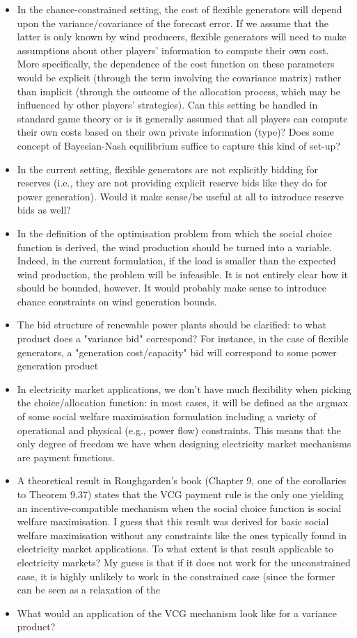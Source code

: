 \documentclass{article}
\begin{document}
\begin{itemize}
\item In the chance-constrained setting, the cost of flexible generators will depend upon the variance/covariance of the forecast error. If we assume that the latter is only known by wind producers, flexible generators will need to make assumptions about other players' information to compute their own cost. More specifically, the dependence of the cost function on these parameters would be explicit (through the term involving the covariance matrix) rather than implicit (through the outcome of the allocation process, which may be influenced by other players' strategies). Can this setting be handled in standard game theory or is it generally assumed that all players can compute their own costs based on their own private information (type)? Does some concept of Bayesian-Nash equilibrium suffice to capture this kind of set-up?
\item In the current setting, flexible generators are not explicitly bidding for reserves (i.e., they are not providing explicit reserve bids like they do for power generation). Would it make sense/be useful at all to introduce reserve bids as well?
\item In the definition of the optimisation problem from which the social choice function is derived, the wind production should be turned into a variable. Indeed, in the current formulation, if the load is smaller than the expected wind production, the problem will be infeasible. It is not entirely clear how it should be bounded, however. It would probably make sense to introduce chance constraints on wind generation bounds. 
\item The bid structure of renewable power plants should be clarified: to what product does a "variance bid" correspond? For instance, in the case of flexible generators, a "generation cost/capacity" bid will correspond to some power generation product 
\item In electricity market applications, we don't have much flexibility when picking the choice/allocation function: in most cases, it will be defined as the argmax of some social welfare maximisation formulation including a variety of operational and physical (e.g., power flow) constraints. This means that the only degree of freedom we have when designing electricity market mechanisms are payment functions. 
\item A theoretical result in Roughgarden's book (Chapter 9, one of the corollaries to Theorem 9.37) states that the VCG payment rule is the only one yielding an incentive-compatible mechanism when the social choice function is social welfare maximisation. I guess that this result was derived for basic social welfare maximisation without any constraints like the ones typically found in electricity market applications. To what extent is that result applicable to electricity markets? My guess is that if it does not work for the unconstrained case, it is highly unlikely to work in the constrained case (since the former can be seen as a relaxation of the 
\item What would an application of the VCG mechanism look like for a variance product?
\end{itemize}


\end{document}
